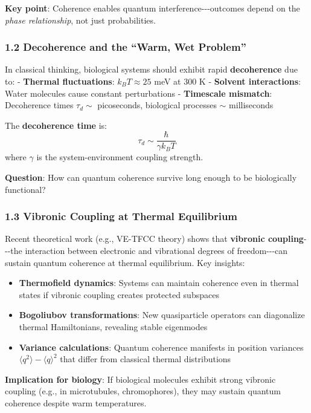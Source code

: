 \textbf{Key point}: Coherence enables quantum
interference-\/-\/-outcomes depend on the \emph{phase relationship}, not
just probabilities.

\subsubsection{1.2 Decoherence and the ``Warm, Wet
Problem''}\label{decoherence-and-the-warm-wet-problem}

In classical thinking, biological systems should exhibit rapid
\textbf{decoherence} due to: - \textbf{Thermal fluctuations}:
\(k_B T \approx 25\) meV at 300 K - \textbf{Solvent interactions}: Water
molecules cause constant perturbations - \textbf{Timescale mismatch}:
Decoherence times \(\tau_d \sim\) picoseconds, biological processes
\(\sim\) milliseconds

The \textbf{decoherence time} is:
\[\tau_d \sim \frac{\hbar}{\gamma k_B T}\] where \(\gamma\) is the
system-environment coupling strength.

\textbf{Question}: How can quantum coherence survive long enough to be
biologically functional?

\subsubsection{1.3 Vibronic Coupling at Thermal
Equilibrium}\label{vibronic-coupling-at-thermal-equilibrium}

Recent theoretical work (e.g., VE-TFCC theory) shows that
\textbf{vibronic coupling}-\/-\/-the interaction between electronic and
vibrational degrees of freedom-\/-\/-can sustain quantum coherence at
thermal equilibrium. Key insights:

\begin{itemize}
\tightlist
\item
  \textbf{Thermofield dynamics}: Systems can maintain coherence even in
  thermal states if vibronic coupling creates protected subspaces
\item
  \textbf{Bogoliubov transformations}: New quasiparticle operators can
  diagonalize thermal Hamiltonians, revealing stable eigenmodes
\item
  \textbf{Variance calculations}: Quantum coherence manifests in
  position variances \(\langle q^2 \rangle - \langle q \rangle^2\) that
  differ from classical thermal distributions
\end{itemize}

\textbf{Implication for biology}: If biological molecules exhibit strong
vibronic coupling (e.g., in microtubules, chromophores), they may
sustain quantum coherence despite warm temperatures.


